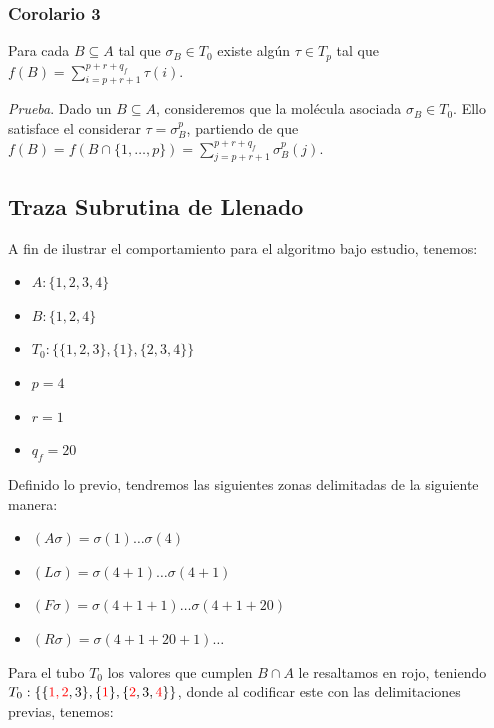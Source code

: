 \documentclass[12pt, letterpaper, twoside]{article}
\begin{document}
    \subsubsection{Corolario 3}
    Para cada $B\subseteq{A}$ tal que $\sigma_{B}\in{T_0}$ existe algún $\tau\in{T_{p}}$ tal que $f(B)=\sum^{p+r+q_f}_{i=p+r+1}\tau(i)$.

    \emph{Prueba}. Dado un $B\subseteq{A}$, consideremos que la molécula asociada $\sigma_{B}\in{T_0}$. Ello satisface el considerar $\tau=\sigma^{p}_{B}$, partiendo de que $f(B)=f(B\cap{\{1,\dots,p\}})=\sum^{p+r+q_f}_{j=p+r+1}\sigma^{p}_{B}(j)$. 

    \newpage
    \subsection{Traza Subrutina de Llenado}
    A fin de ilustrar el comportamiento para el algoritmo bajo estudio, tenemos:
    \begin{multicols}{2}
        \begin{itemize}
        \item $A: \{1, 2, 3, 4\}$
        \item $B: \{1, 2, 4\}$
        \item $T_0: \{\{1,2,3\}, \{1\}, \{2,3,4\}\}$
        \item $p = 4$
        \item $r = 1$
        \item $q_f= 20$
        \end{itemize}
    \end{multicols}

    Definido lo previo, tendremos las siguientes zonas delimitadas de la siguiente manera:
    \begin{multicols}{2}
        \begin{itemize}
            \item $(A\sigma )=\sigma (1)\dots\sigma (4)$
            \item $(L\sigma )=\sigma (4+1)\dots\sigma (4+1)$
            \item $(F\sigma)=\sigma(4+1+1)\dots\sigma(4+1+20)$
            \item $(R\sigma)=\sigma(4+1+20+1)\dots$
        \end{itemize} 
    \end{multicols}

    Para el tubo $T_0$ los valores que cumplen $B\cap{A}$ le resaltamos en rojo, teniendo $T_0: \{\{\textcolor{red}{1, 2}, 3\}, \{\textcolor{red}{1}\}, \{\textcolor{red}{2},3,\textcolor{red}{4}\}\}$, donde al codificar este con las delimitaciones previas, tenemos:
\end{document}
